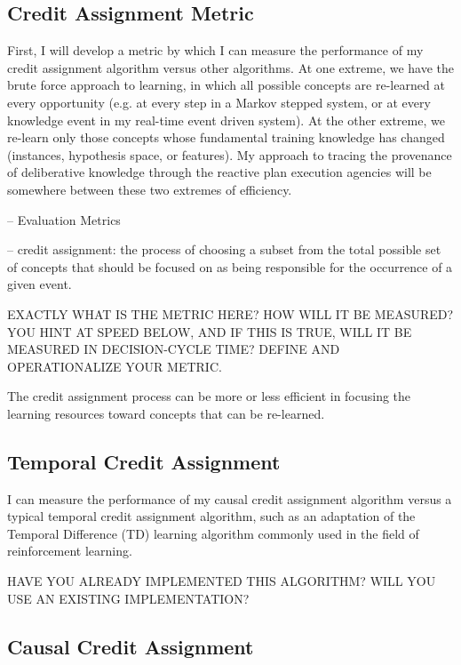 \subsection{Credit Assignment Metric}

  First, I will develop a metric by which I can measure the
  performance of my credit assignment algorithm versus other
  algorithms.  At one extreme, we have the brute force approach to
  learning, in which all possible concepts are re-learned at every
  opportunity (e.g. at every step in a Markov stepped system, or at
  every knowledge event in my real-time event driven system).  At the
  other extreme, we re-learn only those concepts whose fundamental
  training knowledge has changed (instances, hypothesis space, or
  features).  My approach to tracing the provenance of deliberative
  knowledge through the reactive plan execution agencies will be
  somewhere between these two extremes of efficiency.


  -- Evaluation Metrics

     -- credit assignment: the process of choosing a subset from the
                           total possible set of concepts that should
                           be focused on as being responsible for the
                           occurrence of a given event.

EXACTLY WHAT IS THE METRIC HERE? HOW WILL IT BE MEASURED? YOU HINT AT SPEED BELOW, AND IF THIS IS TRUE, WILL IT BE MEASURED IN DECISION-CYCLE TIME? DEFINE AND OPERATIONALIZE YOUR METRIC.

       The credit assignment process can be more or less efficient in
       focusing the learning resources toward concepts that can be
       re-learned.

\subsection{Temporal Credit Assignment}

       I can measure the performance of my causal credit assignment
       algorithm versus a typical temporal credit assignment
       algorithm, such as an adaptation of the Temporal Difference
       (TD) learning algorithm commonly used in the field of
       reinforcement learning.

HAVE YOU ALREADY IMPLEMENTED THIS ALGORITHM? WILL YOU USE AN EXISTING IMPLEMENTATION?

\subsection{Causal Credit Assignment}

